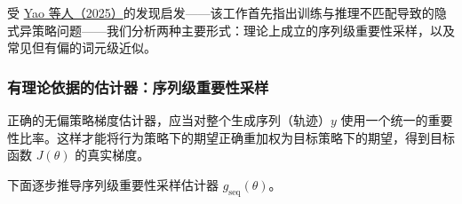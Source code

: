
受 \href{https://fengyao.notion.site/off-policy-rl}{Yao 等人（2025）}的发现启发——该工作首先指出训练与推理不匹配导致的隐式异策略问题——我们分析两种主要形式：理论上成立的序列级重要性采样，以及常见但有偏的词元级近似。




\hypertarget{src-27b211a5-58b7-80b3-8c1a-f3aee1f533e7}{}
\subsubsection*{有理论依据的估计器：序列级重要性采样}



正确的无偏策略梯度估计器，应当对整个生成序列（轨迹）$y$ 使用一个统一的重要性比率。这样才能将行为策略下的期望正确重加权为目标策略下的期望，得到目标函数 $J(\theta)$ 的真实梯度。



下面逐步推导序列级重要性采样估计器 $g_{\mathrm{seq}}(\theta)$。



